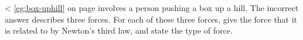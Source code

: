  <%
\ref{eg:box-uphill} on page \pageref{eg:box-uphill} involves a person
pushing a box up a hill. The incorrect answer describes
three forces. For each of these three forces, give the force
that it is related to by Newton's third law, and state the type of force.
